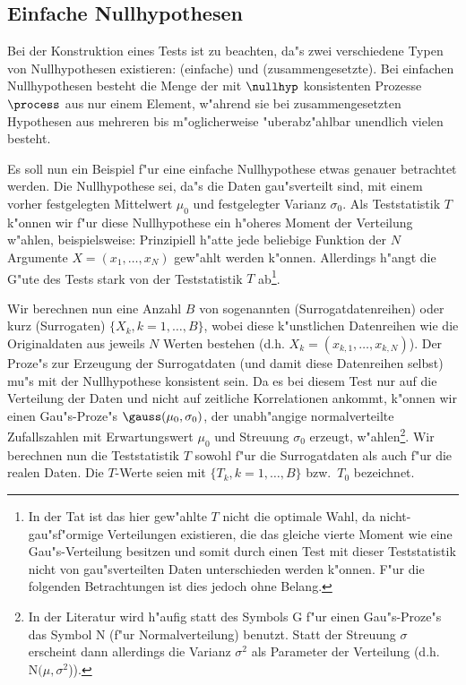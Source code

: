 \subsection{Einfache Nullhypothesen}
Bei der Konstruktion eines Tests ist zu beachten, da"s zwei verschiedene Typen von
Nullhypothesen existieren: \begriff(einfache) und \begriff(zusammengesetzte). Bei
einfachen Nullhypothesen besteht die Menge der mit $\nullhyp$ konsistenten Prozesse
$\process$ aus nur einem Element, w"ahrend sie bei zusammengesetzten Hypothesen aus
mehreren bis m"oglicherweise "uberabz"ahlbar unendlich vielen besteht.

Es soll nun ein Beispiel f"ur eine einfache Nullhypothese etwas genauer betrachtet werden.
Die Nullhypothese sei, da"s die Daten gau"sverteilt sind, mit einem vorher festgelegten
Mittelwert $\mu_0$ und festgelegter Varianz $\sigma_0$. Als Teststatistik $T$ k"onnen wir
f"ur diese Nullhypothese ein h"oheres Moment der Verteilung w"ahlen, beispielsweise:
Prinzipiell h"atte jede beliebige Funktion der $N$ Argumente $X=(x_1,\dots,x_N) $ gew"ahlt
werden k"onnen.  Allerdings h"angt die G"ute des Tests stark von der Teststatistik $T$
ab\footnote{In der Tat ist das hier gew"ahlte $T$ nicht die optimale Wahl, da
  nicht-gau"sf"ormige Verteilungen existieren, die das gleiche vierte Moment wie eine
  Gau"s-Verteilung besitzen und somit durch einen Test mit dieser Teststatistik nicht von
  gau"sverteilten Daten unterschieden werden k"onnen. F"ur die folgenden Betrachtungen ist
  dies jedoch ohne Belang.}.


Wir berechnen nun eine Anzahl $B$ von sogenannten \begriff(Surrogatdatenreihen) oder kurz
\begriff(Surrogaten) $\{X_k, k=1,\dots,B\}$, wobei diese k"unstlichen Datenreihen wie die
Originaldaten aus jeweils $N$ Werten bestehen (d.h. $X_k=(x_{k,1},\dots,x_{k,N})$). Der
Proze"s zur Erzeugung der Surrogatdaten (und damit diese Datenreihen selbst) mu"s mit der
Nullhypothese konsistent sein. Da es bei diesem Test nur auf die Verteilung der Daten und
nicht auf zeitliche Korrelationen ankommt, k"onnen wir einen Gau"s-Proze"s
$\gauss(\mu_0,\sigma_0)$, der unabh"angige normalverteilte Zufallszahlen mit
Erwartungswert $\mu_0$ und Streuung $\sigma_0$ erzeugt, w"ahlen\footnote{In der Literatur
  wird h"aufig statt des Symbols $\mathrm{G}$ f"ur einen Gau"s-Proze"s das Symbol $\mathrm{N}$ (f"ur
  Normalverteilung) benutzt. Statt der Streuung $\sigma$ erscheint dann allerdings die
  Varianz $\sigma^2$ als Parameter der Verteilung (d.h. $\mathrm{N}(\mu,\sigma^2$)).}. Wir berechnen nun die
Teststatistik $T$ sowohl f"ur die Surrogatdaten als auch f"ur die realen Daten. Die
$T$-Werte seien mit $\{T_k,k=1,\dots,B\}$ bzw.\ $T_0$ bezeichnet.

